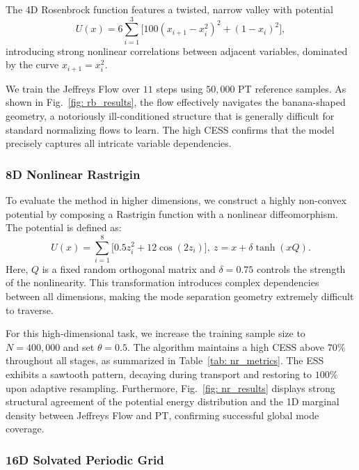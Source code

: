 \documentclass[%
 reprint,
 amsmath,amssymb,
 aps,
 pre,
]{revtex4-2}
\begin{document}
The 4D Rosenbrock function features a twisted, narrow valley with potential
\begin{equation*}
	U(x)=6\sum_{i=1}^3 \Big[ 100(x_{i+1} - x_i^2)^2 + (1 - x_i)^2 \Big],
\end{equation*}
introducing strong nonlinear correlations between adjacent variables, dominated by the curve $x_{i+1} = x_i^2$.

We train the Jeffreys Flow over $11$ steps using $50,000$ PT reference samples. As shown in Fig.~\ref{fig: rb_results}, the flow effectively navigates the banana-shaped geometry, a notoriously ill-conditioned structure that is generally difficult for standard normalizing flows to learn. The high CESS confirms that the model precisely captures all intricate variable dependencies.

\subsubsection*{8D Nonlinear Rastrigin}

To evaluate the method in higher dimensions, we construct a highly non-convex potential by composing a Rastrigin function with a nonlinear diffeomorphism. The potential is defined as:
\begin{equation*}
	U(x) = \sum_{i=1}^8 \Big[ 0.5z_i^2 + 12 \cos(2z_i) \Big], ~ z = x + \delta \tanh(xQ).
\end{equation*}
Here, $Q$ is a fixed random orthogonal matrix and $\delta = 0.75$ controls the strength of the nonlinearity. This transformation introduces complex dependencies between all dimensions, making the mode separation geometry extremely difficult to traverse.

For this high-dimensional task, we increase the training sample size to $N = 400{,}000$ and set $\theta=0.5$. The algorithm maintains a high CESS above $70\%$ throughout all stages, as summarized in Table~\ref{tab: nr_metrics}. The ESS exhibits a sawtooth pattern, decaying during transport and restoring to $100\%$ upon adaptive resampling. Furthermore, Fig.~\ref{fig: nr_results} displays strong structural agreement of the potential energy distribution and the 1D marginal density between Jeffreys Flow and PT, confirming successful global mode coverage.

\subsubsection*{16D Solvated Periodic Grid}
\end{document}
